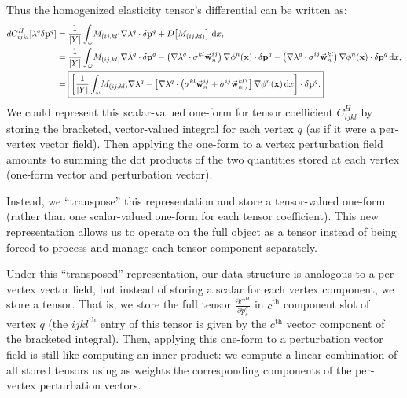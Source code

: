 \documentclass[10pt]{article}
\providecommand{\grad}{\nabla}
\providecommand{\vint}[3][x]{\int_{#2} \! #3 \, \mathrm{d}#1}
\providecommand{\pder}[2]{\frac{\partial #1}{\partial #2}}
\providecommand{\MDer}[1]{D\!\left[#1\right]}
\def\x{{\bf x}}
\def\w{{\bf w}}
\def\p{{\bf p}}
\begin{document}
Thus the homogenized elasticity tensor's differential can be written as:
\begin{align*}
    dC^H_{ijkl}[\lambda^q \delta \p^q]
    &= \frac{1}{|Y|} \vint{\omega}{M_{(ij,kl)} \grad \lambda^q \cdot \delta \p^q + \MDer{M_{(ij, kl)}}}, \\
    &= \frac{1}{|Y|} \vint{\omega}{M_{(ij,kl)} \grad \lambda^q \cdot \delta \p^q
            - \left(\grad \lambda^q \cdot \sigma^{kl} \vec{\w}^{ij}_n \right) \grad \phi^n(\x) \cdot \delta \p^q
            - \left(\grad \lambda^q \cdot \sigma^{ij} \vec{\w}^{kl}_n \right) \grad \phi^n(\x) \cdot \delta \p^q}, \\
    &=
\boxed{
    \left[
       \frac{1}{|Y|} \vint{\omega}{M_{(ij,kl)} \grad \lambda^q
           - \left[\grad \lambda^q \cdot \left( \sigma^{kl} \vec{\w}^{ij}_n
                                         + \sigma^{ij} \vec{\w}^{kl}_n
                             \right) \right] \grad \phi^n(\x)}
    \right] \cdot \delta \p^q.
}
\end{align*}
We could represent this scalar-valued one-form for tensor coefficient
$C^H_{ijkl}$ by storing the bracketed, vector-valued integral for each vertex
$q$ (as if it were a per-vertex vector field). Then applying the one-form to a
vertex perturbation field amounts to summing the dot products of the two
quantities stored at each vertex (one-form vector and perturbation vector).

Instead, we ``transpose'' this representation and store a tensor-valued one-form
(rather than one scalar-valued one-form for each tensor coefficient). This new
representation allows us to operate on the full object as a tensor instead of
being forced to process and manage each tensor component separately. 

Under this ``transposed'' representation, our data structure is analogous to a
per-vertex vector field, but instead of storing a scalar for each vertex
component, we store a tensor. That is, we store the full tensor
$\pder{C^H}{p^q_c}$ in $c^\text{th}$ component slot of vertex $q$ (the $ijkl^\text{th}$
entry of this tensor is given by the $c^\text{th}$ vector component of the bracketed integral).
Then, applying this one-form to a perturbation vector field is still like
computing an inner product: we compute a linear combination of all stored
tensors using as weights the corresponding components of the per-vertex
perturbation vectors.
\end{document}
